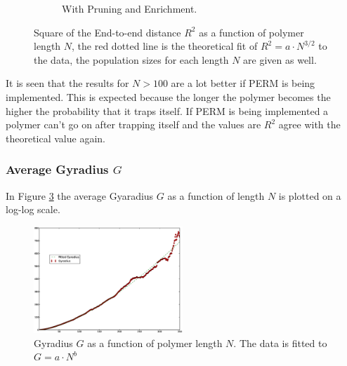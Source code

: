 \begin{figure}[htb]
\begin{subfigure}[b]{0.45\textwidth}
                \caption{With Pruning and Enrichment.}
                \label{fig:etoe_prem}
        \end{subfigure}
        \caption{Square of the End-to-end distance $R^2$ as a function of polymer length $N$, the red dotted line is the theoretical fit of $R^2=a\cdot N^{3/2}$ to the data, the population sizes for each length $N$ are given as well.}
        \label{fig:etoe}
\end{figure}

It is seen that the results for $N>100$ are a lot better if PERM is being implemented. This is expected because the longer the polymer becomes the higher the probability that it traps itself. If PERM is being implemented a polymer can't go on after trapping itself and the values are $R^2$ agree with the theoretical value again. 


\subsubsection*{Average Gyradius $G$}

In Figure \ref{fig:gyradius} the average Gyaradius $G$ as a function of length $N$ is plotted on a log-log scale.


\begin{figure}[ht!]
\centering
\includegraphics[width=0.5\textwidth]{figures/N350_Gyradius_PERM1}
\caption{Gyradius $G$ as a function of polymer length $N$. The data is fitted to $G=a\cdot N^b$}
\label{fig:gyradius}
\end{figure}